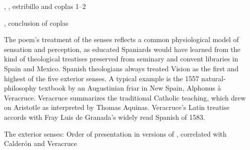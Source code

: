 \begin{expoem}
    \caption{, 
    , estribillo and coplas 1--2}
    \label{expoem:Si_los_sentidos-Sanchez-estribillo}
\end{expoem}
\begin{expoem}
    \caption{, 
    conclusion of coplas}
    \label{expoem:Si_los_sentidos-Sanchez-coplas}
\end{expoem}


The poem's treatment of the senses reflects a common physiological model of 
sensation and perception, as educated Spaniards would have learned from the 
kind of theological treatises preserved from seminary and convent libraries in 
Spain and Mexico.
Spanish theologians always treated Vision as the first and highest of the five 
exterior senses.
A typical example is the 1557 natural-philosophy textbook  by an Augustinian friar in New Spain, Alphonus à Veracruce.%
    \Autocite{Veracruce:Phisica}
Veracruce summarizes the traditional Catholic teaching, which drew on Aristotle 
as interpreted by Thomas Aquinas.
Veracruce's Latin treatise accords with Fray Luis de Granada's widely read 
Spanish  of 1583.%
    \Autocites{LuisdeGranada:Simbolo}
    [(part I)]{LuisdeGranada-Balcells:SimboloPtI}

\begin{table}
    \caption{The exterior senses: Order of presentation in versions of 
    , correlated with Calderón and Veracruce}
    \label{table:senses-order}
\end{table}

